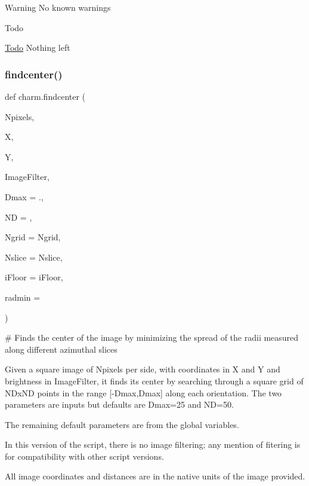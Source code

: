 \begin{DoxyWarning}{Warning}
No known warnings
\end{DoxyWarning}
\begin{DoxyRefDesc}{Todo}
\item[\mbox{\hyperlink{todo__todo000005}{Todo}}]Nothing left \end{DoxyRefDesc}
\mbox{\label{namespacecharm_a033b21f5f3466dba63640f1884bc0fb1}} 
\subsubsection{\texorpdfstring{findcenter()}{findcenter()}}
{\footnotesize\ttfamily def charm.\+findcenter (\begin{DoxyParamCaption}\item[{}]{Npixels,  }\item[{}]{X,  }\item[{}]{Y,  }\item[{}]{Image\+Filter,  }\item[{}]{Dmax = {.},  }\item[{}]{ND = {},  }\item[{}]{Ngrid = {\ttfamily Ngrid},  }\item[{}]{Nslice = {\ttfamily Nslice},  }\item[{}]{i\+Floor = {\ttfamily iFloor},  }\item[{}]{radmin = {} }\end{DoxyParamCaption})}



\# Finds the center of the image by minimizing the spread of the radii measured along different azimuthal slices 

Given a square image of Npixels per side, with coordinates in X and Y and brightness in Image\+Filter, it finds its center by searching through a square grid of N\+Dx\+ND points in the range \mbox{[}-\/Dmax,Dmax\mbox{]} along each orientation. The two parameters are inputs but defaults are Dmax=25 and ND=50.

The remaining default parameters are from the global variables.

In this version of the script, there is no image filtering; any mention of fitering is for compatibility with other script versions.

All image coordinates and distances are in the native units of the image provided.

